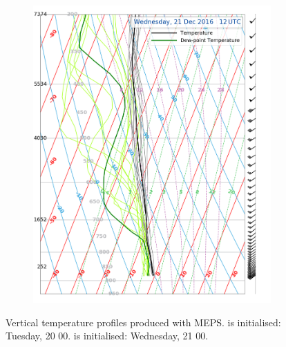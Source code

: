 \begin{figure}
\begin{subfigure}[b]{0.49\textwidth}
		\includegraphics[width=\textwidth]{./fig_Sounding/20161221_12}
		\caption{}\label{fig:meps_sound_21}
	\end{subfigure}
	\caption{Vertical temperature profiles produced with MEPS.  is initialised: Tuesday, \SI{20}{\dec} \SI{00}{\UTC}.  is initialised: Wednesday, \SI{21}{\dec} \SI{00}{\UTC}.}
\end{figure}